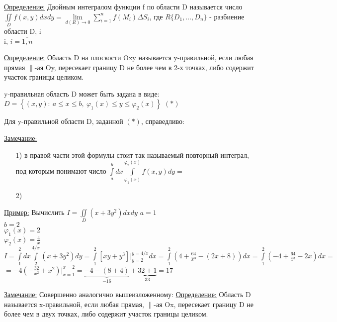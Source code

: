 
\underline{Определение:} Двойным интегралом функции f по области D называется число
$ \iint\limits_{D} f(x,y) dxdy = \lim\limits_{d(R) \rightarrow 0} \sum\limits_{i=1}^{n} f(M_i) \Delta S_i$, где $R\{D_1, ... , D_n\}$ - разбиение области D, i \\
i, $i = \overline{1,n}$

\underline{Определение:} Область D на плоскости Oxy называется  y-правильной, если любая прямая $\parallel$-ая Oy, пересекает границу D не более чем в 2-х точках, либо содержит участок границы целиком.

y-правильная область D может быть задана в виде:
$D = \left\{ (x,y): \ a \leqslant x \leqslant b, \ \varphi_1(x) \leqslant y \leqslant \varphi_2(x) \right\}$ $(*)$

Для y-правильной области D, заданной $(*)$, справедливо:


\underline{Замечание:}
\begin{enumerate}
	\item[1)] 
	в правой части этой формулы стоит так называемый повторный интеграл, под которым понимают число
	$\int\limits_{a}^{b} dx \int\limits_{\varphi_1(x)}^{\varphi_2(x)} f(x,y) dy = $
	
	\item[2)]
\end{enumerate}


\underline{Пример:} Вычислить $I = \iint\limits_{D} (x + 3y^2) dxdy$
$a = 1$ \\
$b = 2$ \\
$\varphi_1(x) = 2$ \\
$\varphi_2(x) = \frac{4}{x}$ \\

$I = 
\int\limits_{1}^{2} dx \int\limits_{2}^{4 \slash x} (x+3y^2)dy = 
\int\limits_{1}^{2} \left[ xy + y^3 \right] \bigg|_{y=2}^{y=4\slash x} dx =
\int\limits_{1}^{2} \left( 4 + \frac{64}{x^3} - (2x + 8) \right) dx = 
\int\limits_{1}^{2} \left( -4 + \frac{64}{x^3} - 2x \right) dx = $
 $= 
-4 \left( -\frac{32}{x^2} + x^2 \right) \bigg|_{x=1}^{x=2} = 
\underbrace{-4 - (8+4)}_{-16} + \underbrace{32+1}_{33} = 17$


\underline{Замечание:} Совершенно аналогично вышеизложенному: 
\underline{Определение:} Область D называется x-правильной, если любая прямая, $\parallel$-ая Ox, пересекает границу D не более чем в двух точках, либо содержит участок границы целиком.


